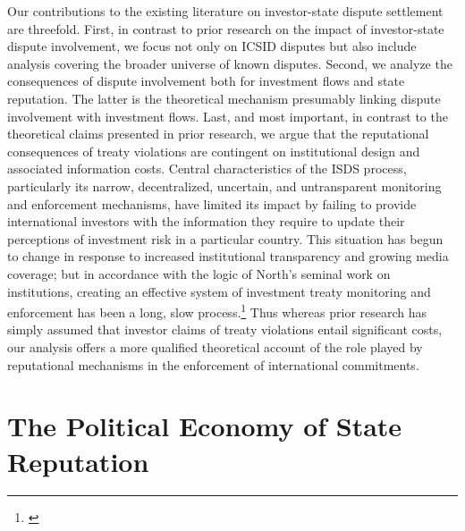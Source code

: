 \documentclass[12pt,onesided]{amsart}
\begin{document}
Our contributions to the existing literature on investor-state dispute settlement are threefold. First, in contrast to prior research on the impact of investor-state dispute involvement, we focus not only on ICSID disputes but also include analysis covering the broader universe of known disputes. Second, we analyze the consequences of dispute involvement both for investment flows and state reputation. The latter is the theoretical mechanism presumably linking dispute involvement with investment flows. Last, and most important, in contrast to the theoretical claims presented in prior research, we argue that the reputational consequences of treaty violations are contingent on institutional design and associated information costs. Central characteristics of the ISDS process, particularly its narrow, decentralized, uncertain, and untransparent monitoring and enforcement mechanisms, have limited its impact by failing to provide international investors with the information they require to update their perceptions of investment risk in a particular country. This situation has begun to change in response to increased institutional transparency and growing media coverage; but in accordance with the logic of North's seminal work on institutions, creating an effective system of investment treaty monitoring and enforcement has been a long, slow process.\footnote{\citet[p. 60]{north1990institutions}} Thus whereas prior research has simply assumed that investor claims of treaty violations entail significant costs, our analysis offers a more qualified theoretical account of the role played by reputational mechanisms in the enforcement of international commitments.

\section*{The Political Economy of State Reputation}
\end{document}
